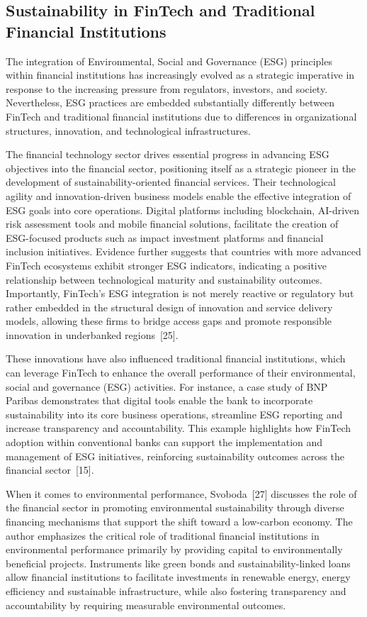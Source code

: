 \documentclass[12pt]{article}
\begin{document}
\subsection{Sustainability in FinTech and Traditional Financial Institutions}
The integration of Environmental, Social and Governance (ESG) principles within financial institutions has increasingly evolved as a strategic imperative in response to the increasing pressure from regulators, investors, and society. Nevertheless, ESG practices are embedded substantially differently between FinTech and traditional financial institutions due to differences in organizational structures, innovation, and technological infrastructures.

The financial technology sector drives essential progress in advancing ESG objectives into the financial sector, positioning itself as a strategic pioneer in the development of sustainability-oriented financial services. Their technological agility and innovation-driven business models enable the effective integration of ESG goals into core operations. Digital platforms including blockchain, AI-driven risk assessment tools and mobile financial solutions, facilitate the creation of ESG-focused products such as impact investment platforms and financial inclusion initiatives. Evidence further suggests that countries with more advanced FinTech ecosystems exhibit stronger ESG indicators, indicating a positive relationship between technological maturity and sustainability outcomes. Importantly, FinTech's ESG integration is not merely reactive or regulatory but rather embedded in the structural design of innovation and service delivery models, allowing these firms to bridge access gaps and promote responsible innovation in underbanked regions~[25].

These innovations have also influenced traditional financial institutions, which can leverage FinTech to enhance the overall performance of their environmental, social and governance (ESG) activities. For instance, a case study of BNP Paribas demonstrates that digital tools enable the bank to incorporate sustainability into its core business operations, streamline ESG reporting and increase transparency and accountability. This example highlights how FinTech adoption within conventional banks can support the implementation and management of ESG initiatives, reinforcing sustainability outcomes across the financial sector~[15].

When it comes to environmental performance, Svoboda~[27] discusses the role of the financial sector in promoting environmental sustainability through diverse financing mechanisms that support the shift toward a low-carbon economy. The author emphasizes the critical role of traditional financial institutions in environmental performance primarily by providing capital to environmentally beneficial projects. Instruments like green bonds and sustainability-linked loans allow financial institutions to facilitate investments in renewable energy, energy efficiency and sustainable infrastructure, while also fostering transparency and accountability by requiring measurable environmental outcomes.
\end{document}

